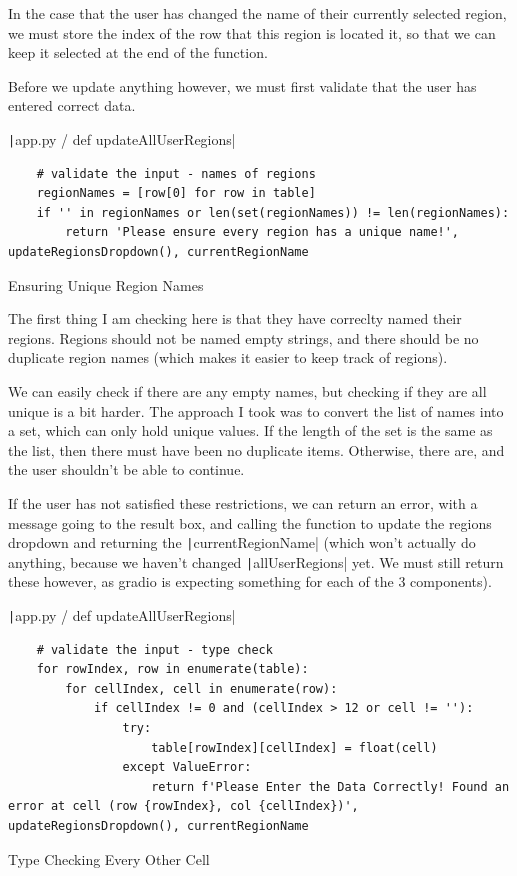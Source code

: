 \documentclass[12pt]{report}
\newcommand{\pil}[1]{\protect\texttt|#1|}
\begin{document}
In the case that the user has changed the name of their currently selected region, we must store the index of the row that this region is located it, so that we can keep it selected at the end of the function.

Before we update anything however, we must first validate that the user has entered correct data.

\begin{listing}[H]
\pil{app.py / def updateAllUserRegions}
\begin{verbatim}
    # validate the input - names of regions
    regionNames = [row[0] for row in table]
    if '' in regionNames or len(set(regionNames)) != len(regionNames):
        return 'Please ensure every region has a unique name!', updateRegionsDropdown(), currentRegionName
\end{verbatim}
\caption{Ensuring Unique Region Names}\label{cs:uniqueRegionNames}
\end{listing}

The first thing I am checking here is that they have correclty named their regions. Regions should not be named empty strings, and there should be no duplicate region names (which makes it easier to keep track of regions).

We can easily check if there are any empty names, but checking if they are all unique is a bit harder. The approach I took was to convert the list of names into a set, which can only hold unique values. If the length of the set is the same as the list, then there must have been no duplicate items. Otherwise, there are, and the user shouldn't be able to continue.

If the user has not satisfied these restrictions, we can return an error, with a message going to the result box, and calling the function to update the regions dropdown and returning the \pil{currentRegionName} (which won't actually do anything, because we haven't changed \pil{allUserRegions} yet. We must still return these however, as gradio is expecting something for each of the 3 components).

\begin{listing}[H]
\pil{app.py / def updateAllUserRegions}
\begin{verbatim}
    # validate the input - type check
    for rowIndex, row in enumerate(table):
        for cellIndex, cell in enumerate(row):
            if cellIndex != 0 and (cellIndex > 12 or cell != ''):
                try:
                    table[rowIndex][cellIndex] = float(cell)
                except ValueError:
                    return f'Please Enter the Data Correctly! Found an error at cell (row {rowIndex}, col {cellIndex})', updateRegionsDropdown(), currentRegionName
\end{verbatim}
\caption{Type Checking Every Other Cell}\label{cs:typeCheckCells}
\end{listing}
\end{document}
